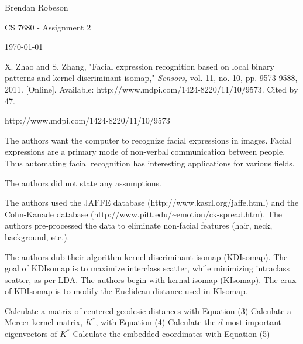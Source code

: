 \documentclass[11pt]{article}
\begin{document}
\noindent Brendan Robeson

\noindent CS 7680 - Assignment 2

\noindent \today

\medskip

\begin{description}[leftmargin=0in]
    \item [Source] X. Zhao and S. Zhang, "Facial expression recognition based on
        local binary patterns and kernel discriminant isomap," \emph{Sensors,}
        vol. 11, no. 10, pp. 9573-9588, 2011. [Online]. Available:
        http://www.mdpi.com/1424-8220/11/10/9573. Cited by 47.

    \item [URL] http://www.mdpi.com/1424-8220/11/10/9573

    \item [Problem] The authors want the computer to recognize facial
        expressions in images. Facial expressions are a primary mode of
        non-verbal communication between people. Thus automating facial
        recognition has interesting applications for various fields.

    \item [Assumptions] The authors did not state any assumptions.

    \item [Data Sets] The authors used the JAFFE database
        (http://www.kasrl.org/jaffe.html) and the Cohn-Kanade database
        (http://www.pitt.edu/\~{}emotion/ck-spread.htm). The authors
        pre-processed the data to eliminate non-facial features (hair, neck,
        background, etc.).

    \item [Algorithm Overview] The authors dub their algorithm kernel
        discriminant isomap (KDIsomap). The goal of KDIsomap is to maximize
        interclass scatter, while minimizing intraclass scatter, as per LDA. The
        authors begin with kernal isomap (KIsomap). The crux of KDIsomap is to
        modify the Euclidean distance used in KIsomap.

        \begin{algorithm}
            Calculate a matrix of centered geodesic distances with Equation
            (3)\;
            Calculate a Mercer kernel matrix, $K^*$, with Equation (4)\;
            Calculate the $d$ most important eigenvectors of $K^*$\;
            Calculate the embedded coordinates with Equation (5)\;
        \end{algorithm}


\end{description}
\end{document}
